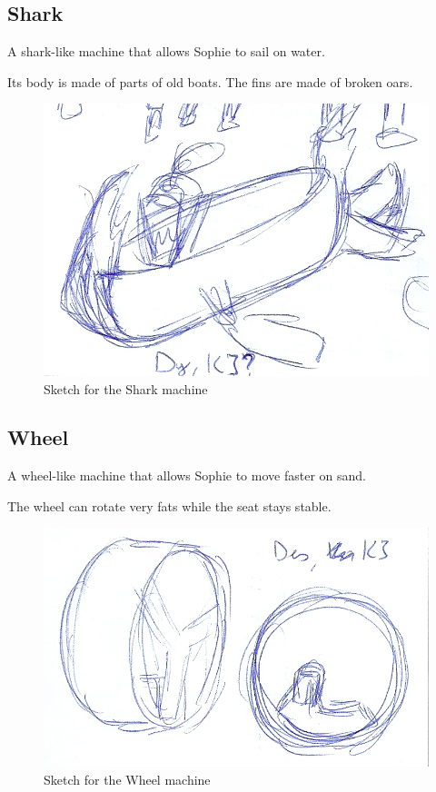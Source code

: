 \pagebreak

\subsection*{Shark}
A shark-like machine that allows Sophie to sail on water.

Its body is made of parts of old boats. The fins are made of broken oars.

\begin{figure}[H]
  \centering
  \includegraphics[width=14cm]{Images/Machines/shark}
  \caption{Sketch for the Shark machine}
\end{figure}

\pagebreak

\subsection*{Wheel}
A wheel-like machine that allows Sophie to move faster on sand.

The wheel can rotate very fats while the seat stays stable.

\begin{figure}[H]
  \centering
  \includegraphics[width=14cm]{Images/Machines/wheel}
  \caption{Sketch for the Wheel machine}
\end{figure}

